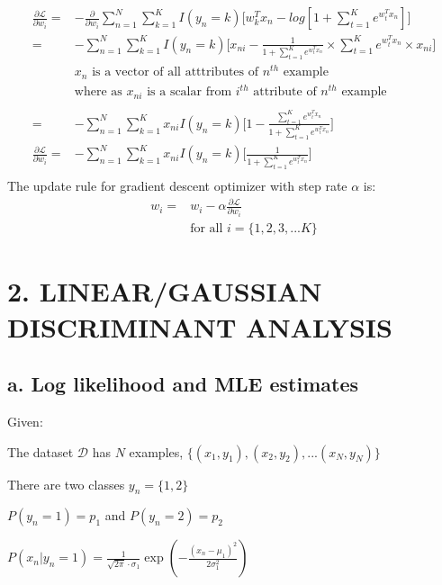 \documentclass[letterpaper,doc,notimes]{apa6}
\begin{document}
{\begin{align*}
\frac{\partial \mathcal{L}}{\partial w_i} = & - \frac{\partial }{\partial w_i } \sum_{n=1}^{N} \sum_{k=1}^{K} I(y_n = k) \bigg[ w_k^Tx_n - log [1 +  \sum_{t=1}^{K} e^{w_t^Tx_n} ] \bigg ] \\
= & - \sum_{n=1}^{N} \sum_{k=1}^{K} I(y_n = k) \bigg[ x_{ni}  - \frac{1}{1 + \sum_{t=1}^{K} e^{w_t^Tx_n}} \times \sum_{t=1}^{K} e^{w_t^Tx_n} \times x_{ni} \bigg] \\
& \text{$x_n$ is a vector of all atttributes of $n^{th}$ example} 
\\ & \text{where as $x_{ni}$ is a scalar from $i^{th}$ attribute of $n^{th}$ example} \\
\\
= & - \sum_{n=1}^{N} \sum_{k=1}^{K} x_{ni} I(y_n = k) \bigg[ 1  - \frac{\sum_{t=1}^{K} e^{w_t^Tx_n}}{1 + \sum_{t=1}^{K} e^{w_t^Tx_n}}  \bigg] \\
\frac{\partial \mathcal{L}}{\partial w_i} = & - \sum_{n=1}^{N} \sum_{k=1}^{K} x_{ni} I(y_n = k) \bigg[ \frac{1}{1 + \sum_{t=1}^{K} e^{w_t^Tx_n}}  \bigg] \\
\end{align*}
The update rule for gradient descent optimizer with step rate $\alpha$ is: 
\begin{align*}
	w_i = & w_i - \alpha \frac{\partial \mathcal{L}}{\partial w_i} \\
	& \text{for all } i = \{1, 2, 3,...K\}
\end{align*}



\section{2. LINEAR/GAUSSIAN DISCRIMINANT ANALYSIS}

\subsection{a. Log likelihood and MLE estimates}
Given:

The dataset $\mathcal{D}$ has $N$ examples, $\{(x_1,y_1), (x_2, y_2), ...(x_N, y_N)\}$

There are two classes $y_n = \{1, 2\} $

$P(y_n = 1) = p_1$ and $P(y_n = 2) = p_2$

$P(x_n | y_n=1) = \frac{1}{\sqrt{2\pi } \cdot \sigma_1} \exp(-\frac{(x_n-\mu_1)^2}{2\sigma_1^2})$

}
\end{document}
